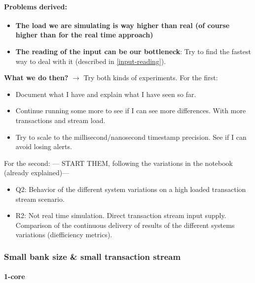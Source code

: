 \paragraph{Problems derived:\\}
\begin{itemize}
    \item \textbf{The load we are simulating is way higher than real (of course higher than for the real time approach)}
    \item \textbf{The reading of the input can be our bottleneck}: Try to find the fastest way to deal with it (described in \ref{input-reading}).    
\end{itemize}

\textbf{What we do then?}
$\rightarrow$ Try both kinds of experiments. 
For the first:
\begin{itemize}
    \item Document what I have and explain what I have seen so far.
    \item Continue running some more to see if I can see more differences. With more transactions and stream load.
    \item Try to scale to the millisecond/nanosecond timestamp precision. See if I can avoid losing alerts.
\end{itemize}
For the second:
--- START THEM, following the variations in the notebook (already explained)---

\begin{itemize}
  \item Q2: Behavior of the different system variations on a high loaded transaction stream scenario.
  \item R2: Not real time simulation. Direct transaction stream input supply. Comparison of the continuous delivery of results of the different systems variations (diefficiency metrics).
\end{itemize}

\subsubsection{Small bank size \& small transaction stream}

\paragraph{1-core\\}


